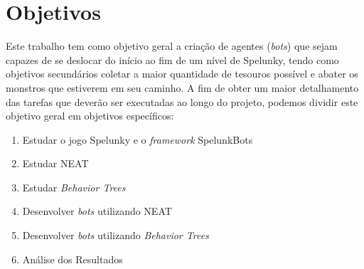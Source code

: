 \chapter{\label{chap:objectives}Objetivos}

Este trabalho tem como objetivo geral a criação de agentes (\textit{bots}) que
sejam capazes de se deslocar do início ao fim de um nível de Spelunky, tendo
como objetivos secundários coletar a maior quantidade de tesouros possível e
abater os monstros que estiverem em seu caminho. A fim de obter um maior
detalhamento das tarefas que deverão ser executadas ao longo do projeto,
podemos dividir este objetivo geral em objetivos específicos:

\begin{enumerate}
    \item
        Estudar o jogo Spelunky e o \textit{framework} SpelunkBots
    \item
        Estudar NEAT
    \item
        Estudar \textit{Behavior Trees}
    \item
        Desenvolver \textit{bots} utilizando NEAT
    \item
        Desenvolver \textit{bots} utilizando \textit{Behavior Trees}
    \item
        Análise dos Resultados
\end{enumerate}
